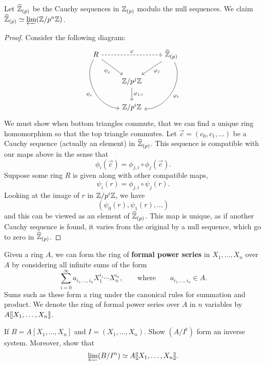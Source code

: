 \documentclass{ximera}
\begin{document}
\begin{example}
  Let $\widehat{\mathbb Z}_{(p)}$ be the Cauchy sequences in $\mathbb Z_{(p)}$ modulo the
  null sequences. We claim $\widehat{\mathbb Z}_{(p)}\simeq\varprojlim(\mathbb Z/p^n\mathbb Z)$.
  \begin{proof}
    Consider the following diagram:
    \[
    \begin{tikzcd}
      R\ar[ddr,bend right=60,swap,"\psi_i"] \ar[dr,swap,"\psi_j"]  \ar[dashed,rr,"\ph"] &   &  \hat{\Z}_{(p)} \ar[ddl,bend left=60,"\ph_i"] \ar[dl,"\ph_j"]\\
      & \Z/p^j\Z \ar[d,"\ph_{j,i}"] &\\
      & \Z/p^i\Z&
    \end{tikzcd}
    \]
    We must show when bottom triangles commute, that we can find a
    unique ring homomorphism so that the top triangle commutes. Let
    $\vec{c}=(c_0,c_1,\dots)$ be a Cauchy sequence (actually an element) in
    $\widehat{\mathbb Z}_{(p)}$. This sequence is compatible with our maps above in
    the sense that
    \[
    \phi_i(\vec{c}) = \phi_{j,i} \circ \phi_j(\vec{c}).
    \]
    Suppose some ring $R$ is given along with other compatible maps,
    \[
    \psi_i(r) = \phi_{j,i}\circ \psi_j(r).
    \]
    Looking at the image of $r$ in $\mathbb Z/p^i\mathbb Z$, we have
    \[
    (\psi_0(r), \psi_1(r),\dots)
    \]
    and this can be viewed as an element of $\widehat{\mathbb Z}_{(p)}$. This map
    is unique, as if another Cauchy sequence is found, it varies from
    the original by a null sequence, which go to zero in
    $\widehat{\mathbb Z}_{(p)}$.
  \end{proof}
\end{example}

\begin{definition}
  Given a ring $A$, we can form the ring of \textbf{formal power
    series} in $X_1,\dots,X_n$ over $A$ by considering all infinite
  sums of the form
  \[
  \sum_{i=0}^\infty a_{i_1,\dots, i_n}X_1^{i_1}\cdots
  X_n^{i_n},\qquad\text{where} \qquad a_{i_1,\dots, i_n}\in A.
  \]
  Sums such as these form a ring under the canonical rules for
  summation and product. We denote the ring of formal power series
  over $A$ in $n$ variables by $A[\hspace{-0.25ex}[ X_1,\dots,X_n]\hspace{-0.25ex}]$.
\end{definition}

\begin{exercise}
  If $B = A[X_1,\dots,X_n]$ and $I = (X_1,\dots,X_n)$. Show $(A/I^t)$
  form an inverse system. Moreover, show that
  \[
  \varprojlim(B/I^n) \simeq A[\hspace{-0.25ex}[ X_1,\dots,X_n]\hspace{-0.25ex}].
  \]
\end{exercise}
\end{document}
